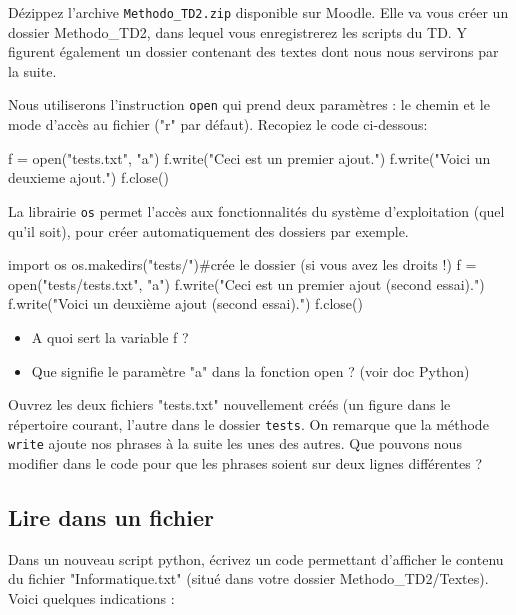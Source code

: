  Dézippez l'archive \texttt{Methodo\_TD2.zip} disponible sur Moodle. Elle va vous créer un dossier Methodo\_TD2, dans lequel vous enregistrerez les scripts du TD. Y figurent également un dossier contenant des textes dont nous nous servirons par la suite.

\exer

 Nous utiliserons l'instruction \texttt{open} qui prend deux paramètres : le chemin et le mode d'accès au fichier ("r" par défaut). Recopiez le code ci-dessous: %
\begin{python}
f = open("tests.txt", "a")
f.write("Ceci est un premier ajout.")
f.write("Voici un deuxieme ajout.")
f.close()
\end{python}

 La librairie \texttt{os} permet l'accès aux fonctionnalités du système d'exploitation (quel qu'il soit), pour créer automatiquement des dossiers par exemple.

\begin{python}
import os 
os.makedirs("tests/")#crée le dossier (si vous avez les droits !)
f = open("tests/tests.txt", "a")
f.write("Ceci est un premier ajout (second essai).")
f.write("Voici un deuxième ajout (second essai).")
f.close()
\end{python}

\begin{itemize}
\item A quoi sert la variable f ?
\item Que signifie le paramètre "a" dans la fonction open ? (voir doc Python)
\end{itemize}

Ouvrez les deux fichiers "tests.txt" nouvellement créés (un figure dans le répertoire courant, l'autre dans le dossier \texttt{tests}.
 On remarque que la méthode \texttt{write} ajoute nos phrases à la suite les unes des autres. Que pouvons nous modifier dans le code pour que les phrases soient sur deux lignes différentes ?

\subsection{Lire dans un fichier}

\exer

 Dans un nouveau script python, écrivez un code permettant d'afficher le contenu du fichier "Informatique.txt" (situé dans votre dossier Methodo\_TD2/Textes). Voici quelques indications :

